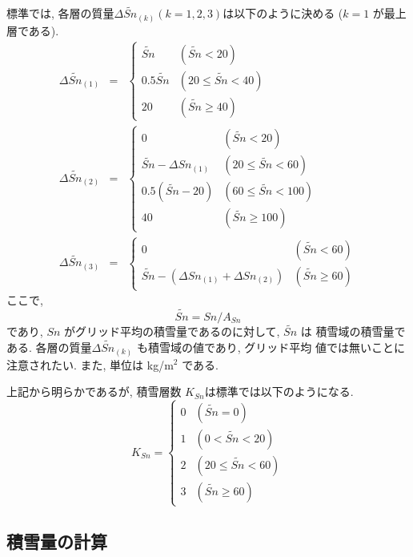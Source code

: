 標準では, 各層の質量$\Delta \widetilde{Sn}_{(k)} (k=1,2,3)$は以下のように決める
($k=1$ が最上層である).
\begin{eqnarray}
 \Delta \widetilde{Sn}_{(1)} &=& \left\{
\begin{array}{ll}
 \widetilde{Sn} & (\widetilde{Sn} < 20) \\
 0.5\widetilde{Sn} & (20 \leq \widetilde{Sn} < 40)\\
 20 & (\widetilde{Sn} \geq 40)
\end{array}
\right. \label{snow_cut1}\\
 \Delta \widetilde{Sn}_{(2)} &=& \left\{
\begin{array}{ll}
 0 & (\widetilde{Sn} < 20) \\
 \widetilde{Sn} - \Delta Sn_{(1)} & (20 \leq \widetilde{Sn} < 60)\\
 0.5(\widetilde{Sn}-20) & (60 \leq \widetilde{Sn} < 100)\\
 40 & (\widetilde{Sn} \geq 100)
\end{array}
\right. \label{snow_cut2}\\
 \Delta \widetilde{Sn}_{(3)} &=& \left\{
\begin{array}{ll}
 0 & (\widetilde{Sn} < 60) \\
 \widetilde{Sn} - (\Delta Sn_{(1)} + \Delta Sn_{(2)})& (\widetilde{Sn} \geq 60)
\end{array}
\right. \label{snow_cut3}
\end{eqnarray}
ここで,
\begin{equation}
 \widetilde{Sn} =  Sn / A_{Sn}
\end{equation}
であり, $Sn$ がグリッド平均の積雪量であるのに対して, $\widetilde{Sn}$ は
積雪域の積雪量である.
各層の質量$\Delta \widetilde{Sn}_{(k)}$ も積雪域の値であり, グリッド平均
値では無いことに注意されたい.
また, 単位は kg/m$^2$ である.

上記から明らかであるが, 積雪層数 $K_{Sn}$は標準では以下のようになる.
\begin{equation}
 K_{Sn} = \left\{
\begin{array}{ll}
 0 & (\widetilde{Sn} = 0)\\
 1 & (0< \widetilde{Sn} < 20)\\
 2 & (20 \leq \widetilde{Sn} < 60)\\
 3 & (\widetilde{Sn} \geq 60)
\end{array}
\right.
\end{equation}

\subsection{積雪量の計算}

